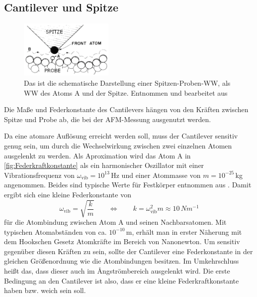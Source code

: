 \subsection{Cantilever und Spitze}
\label{sec:cantilever}
    \setlength{\columnsep}{25pt}
    \begin{figure} %
        \centering{}
        \includegraphics[width=0.4\textwidth]{bilder/Federkraftkonstante.png}
        \caption{Das ist die schematische Darstellung einer Spitzen-Proben-WW, als WW des Atoms A und der Spitze. Entnommen und bearbeitet aus \cite{atomic_force_microscope}} \vspace*{-0.3cm}
        \label{fig:Federkraftkonstante}
    \end{figure} 
    \FloatBarrier
    Die Maße und Federkonstante des Cantilevers hängen von den Kräften zwischen Spitze und Probe ab, die bei der AFM-Messung ausgenutzt werden.
    
    Da eine atomare Auflösung erreicht werden soll, muss der Cantilever sensitiv genug sein, um durch die Wechselwirkung zwischen zwei einzelnen Atomen ausgelenkt zu werden.
    Als Aproximation wird das Atom A in \autoref{fig:Federkraftkonstante} als ein harmonischer Oszillator mit einer Vibrationsfrequenz von $\omega_{\mathrm{vib}} = 10^{13}\,$Hz und einer Atommasse von $m = 10^{-25}\,$kg angenommen.
    Beides sind typische Werte für Festkörper entnommen aus \cite{wiesendanger}.
    Damit ergibt sich eine kleine Federkonstante von
    \begin{equation}
        \omega_{\mathrm{vib}} = \sqrt{\frac{k}{m}} \qquad \Leftrightarrow \qquad k = \omega_{\mathrm{vib}}^2 m \approx 10\,\si{Nm^{-1}}
    \end{equation}
    für die Atombindung zwischen Atom A und seinen Nachbarsatomen.
    Mit typischen Atomabständen von ca. $10^{-10}\,$m, erhält man in erster Näherung mit dem Hookschen Gesetz Atomkräfte im Bereich von Nanonewton.
    Um sensitiv gegenüber diesen Kräften zu sein, sollte der Cantilever eine Federkonstante in der gleichen Größenordnung wie die Atombindungen besitzen.
    Im Umkehrschluss heißt das, dass dieser auch im \r{A}ngströmbereich ausgelenkt wird.
    Die erste Bedingung an den Cantilever ist also, dass er eine kleine Federkraftkonstante haben bzw. weich sein soll.

